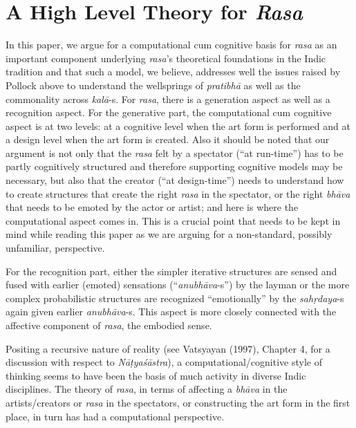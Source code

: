 \section{A High Level Theory for \textsl{Rasa}}\label{chap3-sec3}

In this paper, we argue for a computational cum cognitive basis for \textsl{rasa} as an important component underlying \textsl{rasa}’s theoretical foundations in the Indic tradition and that such a model, we believe, addresses well the issues raised by Pollock above to understand the wellsprings of \textsl{pratibhā} as well as the commonality across \textsl{kalā}-s. For \textsl{rasa}, there is a generation aspect as well as a recognition aspect. For the generative part, the computational cum cognitive aspect is at two levels: at a cognitive level when the art form is performed and at a design level when the art form is created. Also it should be noted that our argument is not only that the \textsl{rasa} felt by a spectator (“at run-time”) has to be partly cognitively structured and therefore supporting cognitive models may be necessary, but also that the creator (“at design-time”) needs to understand how to create structures that create the right \textsl{rasa} in the spectator, or the right \textsl{bhāva} that needs to be emoted by the actor or artist; and here is where the computational aspect comes in. This is a crucial point that needs to be kept in mind while reading this paper as we are arguing for a non-standard, possibly unfamiliar, perspective. 

For the recognition part, either the simpler iterative structures are sensed and fused with earlier (emoted) sensations (“\textsl{anubhāva}-s”) by the layman or the more complex probabilistic structures are recognized “emotionally” by the \textsl{sahṛdaya}-s again given earlier \textsl{anubhāva}-s. This aspect is more closely connected with the affective component of \textsl{rasa}, the embodied sense.

Positing a recursive nature of reality (see Vatsyayan (1997), Chapter 4, for a discussion with respect to \textsl{Nāṭyaśāstra}), a computational/cognitive style of thinking seems to have been the basis of much activity in diverse Indic disciplines. The theory of \textsl{rasa}, in terms of affecting a \textsl{bhāva} in the artists/creators or \textsl{rasa} in the spectators, or constructing the art form in the first place, in turn has had a computational perspective. 

